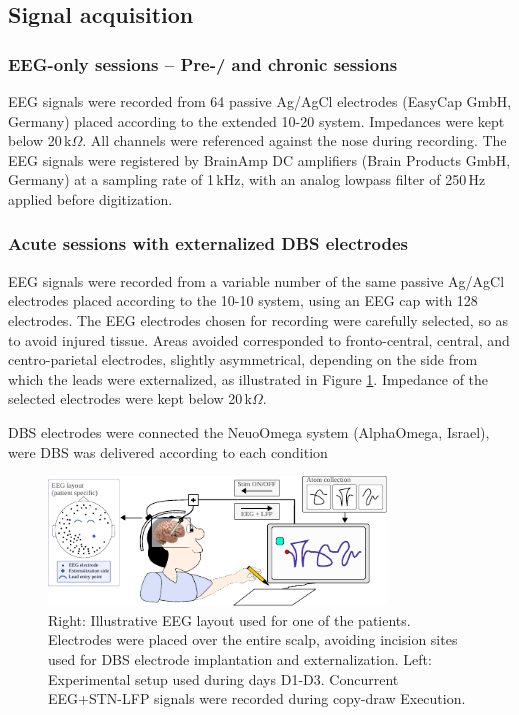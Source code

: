 \documentclass[10pt,a4paper, twocolumn]{article}
\begin{document}
\subsection{Signal acquisition}
\subsubsection{EEG-only sessions -- Pre-/ and chronic sessions}
EEG signals were recorded from 64 passive Ag/AgCl electrodes (EasyCap GmbH, Germany) placed according to the extended 10-20 system. Impedances were kept below 20\,k$\Omega$. All channels were referenced against the nose during recording. The EEG signals were registered by BrainAmp DC amplifiers (Brain Products GmbH, Germany) at a sampling rate of 1\,kHz, with an analog lowpass filter of 250\,Hz applied before digitization.

\subsubsection{Acute sessions with externalized DBS electrodes}
EEG signals were recorded from a variable number of the same passive Ag/AgCl electrodes placed according to the 10-10 system, using an EEG cap with 128 electrodes. The EEG electrodes chosen for recording were carefully selected, so as to avoid injured tissue. Areas avoided corresponded to fronto-central, central, and centro-parietal electrodes, slightly asymmetrical, depending on the side from which the leads were externalized, as illustrated in Figure \ref{fig:paradigm_layout}. Impedance of the selected electrodes were kept below 20\,k$\Omega$.

DBS electrodes were connected the NeuoOmega system (AlphaOmega, Israel), were DBS was delivered according to each condition

\begin{figure}[h!]
\centering
\includegraphics[width=0.8\textwidth]{figures/paradigm_layout}
\caption{Right: Illustrative EEG layout used for one of the patients. Electrodes were placed over the entire scalp, avoiding incision sites used for DBS electrode implantation and externalization. Left: Experimental setup used during days D1-D3. Concurrent EEG+STN-LFP signals were recorded during copy-draw Execution.}
\label{fig:paradigm_layout}
\end{figure}
\end{document}
